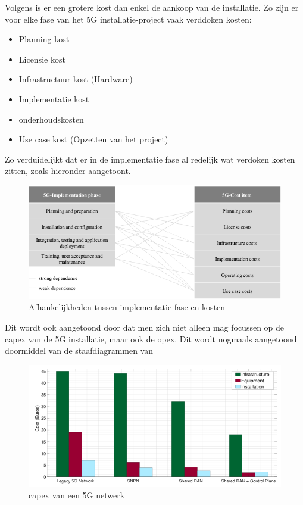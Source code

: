 Volgens \textcite{Abbas2024} is er een grotere kost dan enkel de aankoop van de installatie. Zo zijn er voor elke fase van het 5G installatie-project vaak verddoken kosten:

\begin{itemize}
  \item Planning kost
  \item Licensie kost 
  \item Infrastructuur kost (Hardware)
  \item Implementatie kost
  \item onderhoudskosten
  \item Use case kost (Opzetten van het project)
\end{itemize}

Zo verduidelijkt \textcite{Abbas2024} dat er in de implementatie fase al redelijk wat verdoken kosten zitten, zoals hieronder aangetoont.
\begin{figure}[H]
  \includegraphics[width=\linewidth]{../graphics/kost-associaties.png}
  \caption{Afhankelijkheden tussen implementatie fase en kosten \autocite[Door][Copyright 2024 van]{Abbas2024} \textcite{Abbas2024}}
  \label{fig:Cost}
\end{figure}

Dit wordt ook aangetoond door \textcite{Hilary2024} dat men zich niet alleen mag focussen op de \gls{capex} van de 5G installatie, maar ook de \gls{opex}. Dit wordt nogmaals aangetoond doormiddel van de staafdiagrammen van \textcite{Hilary2024}

\begin{figure}[H]
  \includegraphics[width=\linewidth]{../graphics/capex.png}
  \caption{\gls{capex} van een 5G netwerk \autocite[Door][Copyright 2024 van]{Hilary2024} \textcite{Hilary2024}}
  \label{fig:capex}
\end{figure}

